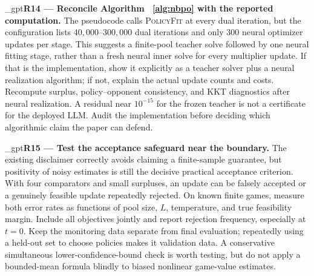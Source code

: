 \documentclass{article}
\makeatletter
\newif\ifshowreviews
\let\revieworiginalref\ref
\newcommand{\reviewref}[1]{%
  \@ifundefined{r@#1}{\textnormal{[original-draft ref.: \texttt{\detokenize{#1}}]}}%
  {\revieworiginalref{#1}}}
\let\ref\reviewref
\newcommand{\reviewresponse}[1]{%
  \ifshowreviews
  \par\begingroup\color{blue!65!black}\hypersetup{allcolors=blue!65!black}\emergencystretch=2em%
  \noindent\textbf{Response:} #1\par\endgroup
  \fi}
\theoremstyle{remark}
\theoremstyle{plain}
\makeatother
\begin{document}
\kekim_gpt{\textbf{R14 --- Reconcile Algorithm~\ref{alg:nbpo} with the reported computation.} The pseudocode calls \textsc{PolicyFit} at every dual iteration, but the configuration lists $40{,}000$--$300{,}000$ dual iterations and only 300 neural optimizer updates per stage. This suggests a finite-pool teacher solve followed by one neural fitting stage, rather than a fresh neural inner solve for every multiplier update. If that is the implementation, show it explicitly as a teacher solver plus a neural realization algorithm; if not, explain the actual update counts and costs. Recompute surplus, policy--opponent consistency, and KKT diagnostics after neural realization. A residual near $10^{-15}$ for the frozen teacher is not a certificate for the deployed LLM. Audit the implementation before deciding which algorithmic claim the paper can defend.}
\reviewresponse{\textbf{R14 --- Partially addressed.} Algorithm~\ref{alg:nbpo} separates the finite-pool solve from one subsequent neural fit; UF-4 reports $1{,}250$ neural updates. Independent target, fitted-pool and fresh-response results now quantify their distinct outcomes. The fitted-pool finite-bank surplus is not a complete post-fit population KKT or opponent-consistency audit, which remains pending.}


\kekim_gpt{\textbf{R15 --- Test the acceptance safeguard near the boundary.} The existing disclaimer correctly avoids claiming a finite-sample guarantee, but positivity of noisy estimates is still the decisive practical acceptance criterion. With four comparators and small surpluses, an update can be falsely accepted or a genuinely feasible update repeatedly rejected. On known finite games, measure both error rates as functions of pool size, $L$, temperature, and true feasibility margin. Include all objectives jointly and report rejection frequency, especially at $t=0$. Keep the monitoring data separate from final evaluation; repeatedly using a held-out set to choose policies makes it validation data. A conservative simultaneous lower-confidence-bound check is worth testing, but do not apply a bounded-mean formula blindly to biased nonlinear game-value estimates.}
\reviewresponse{\textbf{R15 --- Partially addressed.} Acceptance is explicitly empirical and uses development data, with numerical-unresolved and neural-rejected outcomes distinguished. Nonlinear estimation bias is acknowledged. Near-boundary false acceptance, false rejection and joint-objective error-rate sweeps remain unmeasured; the fixed-panel missing-data bounds are not a substitute for those tests.}
\end{document}
